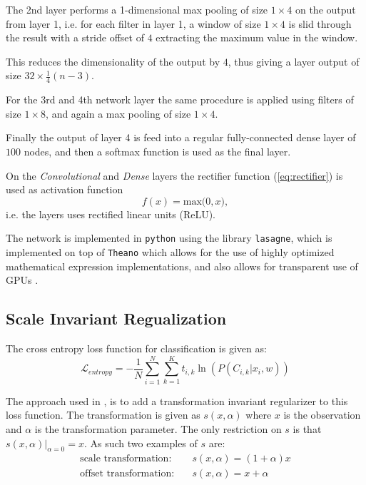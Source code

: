 The 2nd layer performs a 1-dimensional max pooling of size $1 \times 4$ on the output from layer 1, i.e. for each filter in layer 1, a window of size $1 \times 4$ is slid through the result with a stride offset of $4$ extracting the maximum value in the window.

This reduces the dimensionality of the output by $4$, thus giving a layer output of size $32 \times \frac{1}{4}(n-3)$.

For the 3rd and 4th network layer the same procedure is applied using filters of size $1 \times 8$, and again a max pooling of size $1 \times 4$.

Finally the output of layer 4 is feed into a regular fully-connected dense layer of $100$ nodes, and then a softmax function is used as the final layer.

On the \emph{Convolutional} and \emph{Dense} layers the rectifier function (\cref{eq:rectifier}) is used as activation function
\begin{equation}
  f(x) = \text{max(}0, x\text{)},
  \label{eq:rectifier}
\end{equation}
i.e. the layers uses rectified linear units (ReLU).

The network is implemented in \texttt{python} using the library \texttt{lasagne}, which is implemented on top of \texttt{Theano} which allows for the use of highly optimized mathematical expression implementations, and also allows for transparent use of GPUs \cite{theano}.

\subsection{Scale Invariant Regualization}

The cross entropy loss function for classification is given as:
\begin{equation}
\mathcal{L}_{entropy} = - \frac{1}{N} \sum_{i=1}^N \sum_{k=1}^K t_{i,k} \ln(P(C_{i,k} | x_i, w))
\end{equation}

The approach used in \cite{scale-invariante}, is to add a transformation invariant regularizer to this loss function. The transformation is given as $s(x, \alpha)$ where $x$ is the observation and $\alpha$ is the transformation parameter. The only restriction on $s$ is that $s(x, \alpha) |_{\alpha=0} =x$. As such two examples of $s$ are:
\begin{align}
\text{scale transformation:}&\quad s(x, \alpha) = (1+\alpha) x\\
\text{offset transformation:}&\quad s(x, \alpha) = x + \alpha
\end{align}

